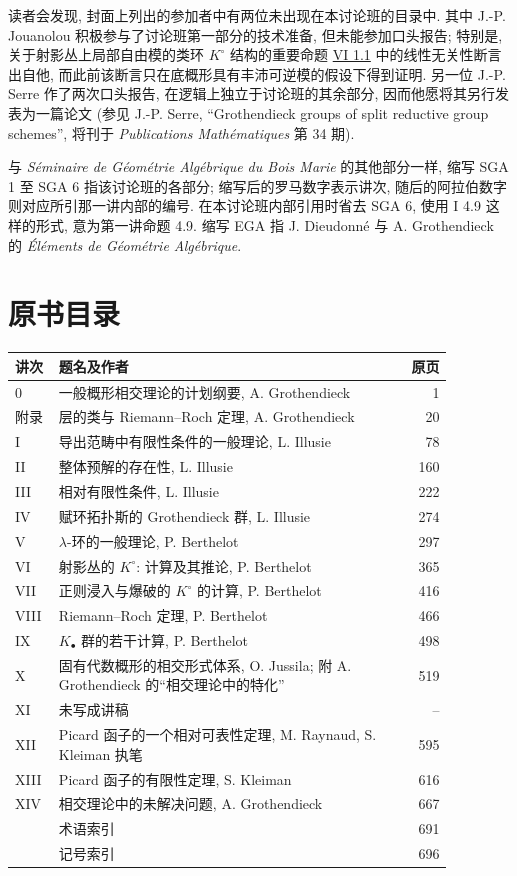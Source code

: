 读者会发现, 封面上列出的参加者中有两位未出现在本讨论班的目录中. 其中 J.-P. Jouanolou 积极参与了讨论班第一部分的技术准备, 但未能参加口头报告; 特别是, 关于射影丛上局部自由模的类环 $K^\circ$ 结构的重要命题 \hyperlink{sga6.e06.thm.1-1}{VI 1.1} 中的线性无关性断言出自他, 而此前该断言只在底概形具有丰沛可逆模的假设下得到证明. 另一位 J.-P. Serre 作了两次口头报告, 在逻辑上独立于讨论班的其余部分, 因而他愿将其另行发表为一篇论文 (参见 J.-P. Serre, ``Grothendieck groups of split reductive group schemes'', 将刊于 \emph{Publications Mathématiques} 第 34 期).

与 \emph{Séminaire de Géométrie Algébrique du Bois Marie} 的其他部分一样, 缩写 SGA 1 至 SGA 6 指该讨论班的各部分; 缩写后的罗马数字表示讲次, 随后的阿拉伯数字则对应所引那一讲内部的编号. 在本讨论班内部引用时省去 SGA 6, 使用 I 4.9 这样的形式, 意为第一讲命题 4.9. 缩写 EGA 指 J. Dieudonné 与 A. Grothendieck 的 \emph{Éléments de Géométrie Algébrique}.

\section*{原书目录}
\begin{longtable}{@{}p{0.10\linewidth}p{0.77\linewidth}r@{}}
\toprule
讲次 & 题名及作者 & 原页 \\
\midrule
0 & 一般概形相交理论的计划纲要, A. Grothendieck & 1 \\
附录 & 层的类与 Riemann--Roch 定理, A. Grothendieck & 20 \\
I & 导出范畴中有限性条件的一般理论, L. Illusie & 78 \\
II & 整体预解的存在性, L. Illusie & 160 \\
III & 相对有限性条件, L. Illusie & 222 \\
IV & 赋环拓扑斯的 Grothendieck 群, L. Illusie & 274 \\
V & $\lambda$-环的一般理论, P. Berthelot & 297 \\
VI & 射影丛的 $K^\circ$: 计算及其推论, P. Berthelot & 365 \\
VII & 正则浸入与爆破的 $K^\circ$ 的计算, P. Berthelot & 416 \\
VIII & Riemann--Roch 定理, P. Berthelot & 466 \\
IX & $K_\bullet$ 群的若干计算, P. Berthelot & 498 \\
X & 固有代数概形的相交形式体系, O. Jussila; 附 A. Grothendieck 的“相交理论中的特化” & 519 \\
XI & 未写成讲稿 & -- \\
XII & Picard 函子的一个相对可表性定理, M. Raynaud, S. Kleiman 执笔 & 595 \\
XIII & Picard 函子的有限性定理, S. Kleiman & 616 \\
XIV & 相交理论中的未解决问题, A. Grothendieck & 667 \\
 & 术语索引 & 691 \\
 & 记号索引 & 696 \\
\bottomrule
\end{longtable}
\clearpage
